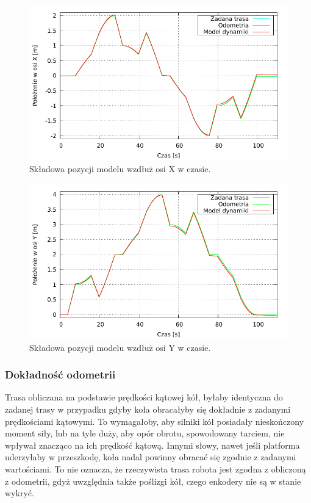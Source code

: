 		\begin{figure}[h]
			\centering
			\includegraphics[width=\textwidth]{plots/comparison_xt.pdf}
				\caption{Składowa pozycji modelu wzdłuż osi X w czasie.}
			\label{plot:comparison_xt}
		\end{figure}
		
		\begin{figure}[h]
			\centering
			\includegraphics[width=\textwidth]{plots/comparison_yt.pdf}
				\caption{Składowa pozycji modelu wzdłuż osi Y w czasie.}
			\label{plot:comparison_yt}
		\end{figure}
		
		\subsubsection{Dokładność odometrii}
			\label{sec:test_odometry}
			Trasa obliczana na podstawie prędkości kątowej kół, byłaby identyczna do zadanej trasy w przypadku gdyby koła obracałyby się dokładnie z zadanymi prędkościami kątowymi.
			To wymagałoby, aby silniki kół posiadały nieskończony moment siły, lub na tyle duży, aby opór obrotu, spowodowany tarciem, nie wpływał 
			znacząco na ich prędkość kątową. Innymi słowy, nawet jeśli platforma uderzyłaby w przeszkodę, koła nadal powinny obracać się zgodnie z zadanymi wartościami.
			To nie oznacza, że rzeczywista trasa robota jest zgodna z obliczoną z odometrii, gdyż uwzględnia także poślizgi kół, czego enkodery nie są w stanie wykryć.
			
